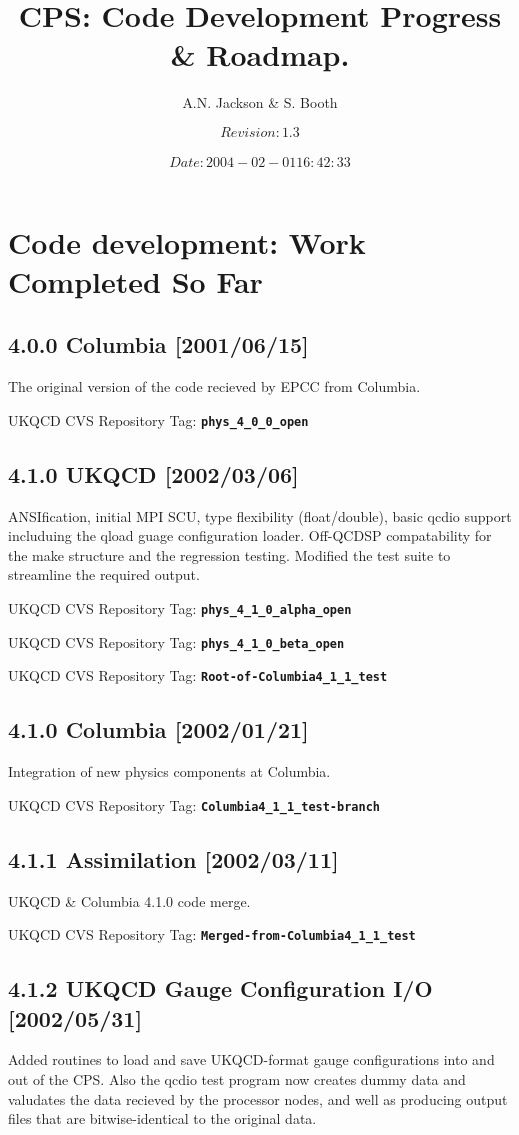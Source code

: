 \documentclass[12pt]{article}
\title{CPS: Code Development Progress \& Roadmap.}
\author{A.N. Jackson \& S. Booth}
\date{\mbox{\small $$Revision: 1.3 $$  $$Date: 2004-02-01 16:42:33 $$}}
\newcommand{\ukqcdtag}[1]{{\small{UKQCD CVS Repository Tag: }{\bf{\tt{#1}}}}}
\begin{document}
\maketitle

\tableofcontents
\newpage

\section{Code development: Work Completed So Far}

\subsection{4.0.0 Columbia [2001/06/15]}
The original version of the code recieved by EPCC from Columbia.

\ukqcdtag{phys\_4\_0\_0\_open}

\subsection{4.1.0  UKQCD [2002/03/06]}
ANSIfication, initial MPI SCU, type flexibility (float/double), basic qcdio
support includuing the qload guage configuration loader.  Off-QCDSP
compatability for the make structure and the regression testing.  Modified the
test suite to streamline the required output.

\ukqcdtag{phys\_4\_1\_0\_alpha\_open}

\ukqcdtag{phys\_4\_1\_0\_beta\_open}

\ukqcdtag{Root-of-Columbia4\_1\_1\_test}

\subsection{4.1.0 Columbia [2002/01/21]}
Integration of new physics components at Columbia.

\ukqcdtag{Columbia4\_1\_1\_test-branch}

\subsection{4.1.1 Assimilation [2002/03/11]}
UKQCD \& Columbia 4.1.0 code merge.

\ukqcdtag{Merged-from-Columbia4\_1\_1\_test}

\subsection{4.1.2 UKQCD Gauge Configuration I/O [2002/05/31]}
Added routines to load and save UKQCD-format gauge configurations into and out
of the CPS.  Also the qcdio test program now creates dummy data and valudates
the data recieved by the processor nodes, and well as producing output files
that are bitwise-identical to the original data.
\end{document}
